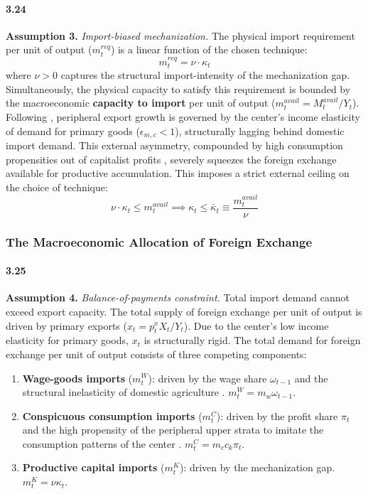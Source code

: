 \paragraph{3.24}
\textbf{Assumption 3.} \textit{Import-biased mechanization.}
The physical import requirement per unit of output
($m^{req}_t$) is a linear function of the chosen technique:
\begin{equation}
	m^{req}_t = \nu \cdot \kappa_t
	\label{eq:33:import_req}
\end{equation}
where $\nu > 0$ captures the structural import-intensity of
the mechanization gap. Simultaneously, the physical capacity
to satisfy this requirement is bounded by the macroeconomic
\textbf{capacity to import} per unit of output
($m^{avail}_t = M^{avail}_t / Y_t$). Following
\citet{Prebisch1981}, peripheral export growth is governed by
the center's income elasticity of demand for primary goods
($\epsilon_{m,c} < 1$), structurally lagging behind domestic
import demand. This external asymmetry, compounded by high
consumption propensities out of capitalist profits
\citep{Kaldor1959}, severely squeezes the foreign exchange
available for productive accumulation. This imposes a strict
external ceiling on the choice of technique:
\begin{equation}
	\nu \cdot \kappa_t \le m^{avail}_t
	\implies \kappa_t \le \bar{\kappa}_t
	\equiv \frac{m^{avail}_t}{\nu}
	\label{eq:33:bop_ceiling}
\end{equation}

\subsubsection{The Macroeconomic Allocation of Foreign
	Exchange}

\paragraph{3.25}
\textbf{Assumption 4.} \textit{Balance-of-payments
	constraint.} Total import demand cannot exceed export
capacity. The total supply of foreign exchange per unit of
output is driven by primary exports
($x_t = p_t^x X_t / Y_t$). Due to the center's low income
elasticity for primary goods, $x_t$ is structurally rigid.
The total demand for foreign exchange per unit of output
consists of three competing components:
\begin{enumerate}
	\item \textbf{Wage-goods imports} ($m^W_t$): driven by the
	wage share $\omega_{t-1}$ and the structural inelasticity
	of domestic agriculture \citep{Kaldor1959}.
	$m^W_t = m_w \omega_{t-1}$.
	\item \textbf{Conspicuous consumption imports} ($m^C_t$):
	driven by the profit share $\pi_t$ and the high propensity
	of the peripheral upper strata to imitate the consumption
	patterns of the center \citep{Prebisch1981, Kaldor1959}.
	$m^C_t = m_c c_k \pi_t$.
	\item \textbf{Productive capital imports} ($m^K_t$): driven
	by the mechanization gap. $m^K_t = \nu \kappa_t$.
\end{enumerate}

